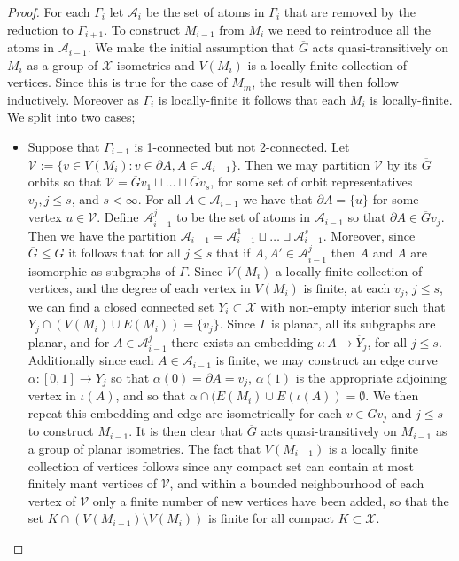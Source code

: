 \documentclass{article}
\numberwithin{equation}{section}
\theoremstyle{definition}
\theoremstyle{remark}
\begin{document}
\begin{proof}
    For each $\Gamma_i$ let $\mathcal{A}_i$ be the set of atoms in $\Gamma_i$ that are removed by the reduction to $\Gamma_{i+1}$.
    To construct $M_{i-1}$ from $M_i$ we need to reintroduce all the atoms in $\mathcal{A}_{i-1}$. We make the initial assumption that $\overline{G}$ acts quasi-transitively on $M_i$ as a group of $\mathcal{X}$-isometries and $V(M_i)$ is a locally finite collection of vertices. Since this is true for the case of $M_m$, the result will then follow inductively. Moreover as $\Gamma_i$ is locally-finite it follows that each $M_i$ is locally-finite. 
    We split into two cases;
    \begin{itemize}
        \item Suppose that $\Gamma_{i-1}$ is 1-connected but not 2-connected. Let $\mathcal{V}:=\{v\in V(M_i):v\in\partial A, A\in\mathcal{A}_{i-1}\}$. Then we may partition $\mathcal{V}$ by its $\overline{G}$ orbits so that $\mathcal{V}=\overline{G}v_1\sqcup \ldots \sqcup \overline{G}v_s$, for some set of orbit representatives $v_j, j\leq s$, and $s<\infty$.
        For all $A\in\mathcal{A}_{i-1}$ we have that $\partial A=\{u\}$ for some vertex $u\in \mathcal{V}$.
        Define $\mathcal{A}_{i-1}^{j}$ to be the set of atoms in $\mathcal{A}_{i-1}$ so that $\partial A\in \overline{ G}v_j$. Then we have the partition $\mathcal{A}_{i-1}=\mathcal{A}_{i-1}^{1}\sqcup \ldots \sqcup \mathcal{A}_{i-1}^s$. Moreover, since $\overline{G}\leq G$ it follows that for all $j\leq s$ that if $A,A'\in \mathcal{A}_{i-1}^j$ then $A$ and $A$ are isomorphic as subgraphs of $\Gamma$.
       Since $V(M_i)$ a locally finite collection of vertices, and the degree of each vertex in $V(M_i)$ is finite, at each $v_j$, $j\leq s$, we can find a closed connected set $Y_i\subset \mathcal{X}$ with non-empty interior such that $Y_j\cap (V(M_i)\cup E(M_i))=\{v_j\}$. 
       Since $\Gamma$ is planar, all its subgraphs are planar, and for $A\in\mathcal{A}_{i-1}^j$ there exists an embedding $\iota: A\rightarrow \mathring{Y_j}$, for all $j\leq s$. Additionally since each $A\in \mathcal{A}_{i-1}$ is finite, we may construct an edge curve $\alpha:[0,1]\rightarrow Y_j$ so that $\alpha(0)=\partial A= v_j$, $\alpha(1)$ is the appropriate adjoining vertex in $\iota(A)$, and so that $\alpha \cap (E(M_i)\cup E(\iota(A))=\emptyset$. We then repeat this embedding and edge arc isometrically for each $v\in\overline{G}v_j$ and $j\leq s$ to construct $M_{i-1}$. 
       It is then clear that $\overline{G}$ acts quasi-transitively on $M_{i-1}$ as a group of planar isometries. The fact that $V(M_{i-1})$ is a locally finite collection of vertices follows since any compact set can contain at most finitely mant vertices of $\mathcal{V}$, and within a bounded neighbourhood of each vertex of $\mathcal{V}$ only a finite number
       of new vertices have been added, so that the set $K\cap (V(M_{i-1})\setminus V(M_i))$ is finite for all compact $K\subset\mathcal{X}$.
        

\end{itemize}
\end{proof}
\end{document}
